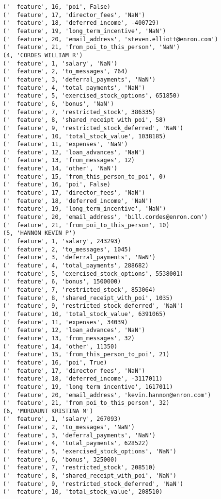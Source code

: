 \begin{verbatim}
('  feature', 16, 'poi', False)
('  feature', 17, 'director_fees', 'NaN')
('  feature', 18, 'deferred_income', -400729)
('  feature', 19, 'long_term_incentive', 'NaN')
('  feature', 20, 'email_address', 'steven.elliott@enron.com')
('  feature', 21, 'from_poi_to_this_person', 'NaN')
(4, 'CORDES WILLIAM R')
('  feature', 1, 'salary', 'NaN')
('  feature', 2, 'to_messages', 764)
('  feature', 3, 'deferral_payments', 'NaN')
('  feature', 4, 'total_payments', 'NaN')
('  feature', 5, 'exercised_stock_options', 651850)
('  feature', 6, 'bonus', 'NaN')
('  feature', 7, 'restricted_stock', 386335)
('  feature', 8, 'shared_receipt_with_poi', 58)
('  feature', 9, 'restricted_stock_deferred', 'NaN')
('  feature', 10, 'total_stock_value', 1038185)
('  feature', 11, 'expenses', 'NaN')
('  feature', 12, 'loan_advances', 'NaN')
('  feature', 13, 'from_messages', 12)
('  feature', 14, 'other', 'NaN')
('  feature', 15, 'from_this_person_to_poi', 0)
('  feature', 16, 'poi', False)
('  feature', 17, 'director_fees', 'NaN')
('  feature', 18, 'deferred_income', 'NaN')
('  feature', 19, 'long_term_incentive', 'NaN')
('  feature', 20, 'email_address', 'bill.cordes@enron.com')
('  feature', 21, 'from_poi_to_this_person', 10)
(5, 'HANNON KEVIN P')
('  feature', 1, 'salary', 243293)
('  feature', 2, 'to_messages', 1045)
('  feature', 3, 'deferral_payments', 'NaN')
('  feature', 4, 'total_payments', 288682)
('  feature', 5, 'exercised_stock_options', 5538001)
('  feature', 6, 'bonus', 1500000)
('  feature', 7, 'restricted_stock', 853064)
('  feature', 8, 'shared_receipt_with_poi', 1035)
('  feature', 9, 'restricted_stock_deferred', 'NaN')
('  feature', 10, 'total_stock_value', 6391065)
('  feature', 11, 'expenses', 34039)
('  feature', 12, 'loan_advances', 'NaN')
('  feature', 13, 'from_messages', 32)
('  feature', 14, 'other', 11350)
('  feature', 15, 'from_this_person_to_poi', 21)
('  feature', 16, 'poi', True)
('  feature', 17, 'director_fees', 'NaN')
('  feature', 18, 'deferred_income', -3117011)
('  feature', 19, 'long_term_incentive', 1617011)
('  feature', 20, 'email_address', 'kevin.hannon@enron.com')
('  feature', 21, 'from_poi_to_this_person', 32)
(6, 'MORDAUNT KRISTINA M')
('  feature', 1, 'salary', 267093)
('  feature', 2, 'to_messages', 'NaN')
('  feature', 3, 'deferral_payments', 'NaN')
('  feature', 4, 'total_payments', 628522)
('  feature', 5, 'exercised_stock_options', 'NaN')
('  feature', 6, 'bonus', 325000)
('  feature', 7, 'restricted_stock', 208510)
('  feature', 8, 'shared_receipt_with_poi', 'NaN')
('  feature', 9, 'restricted_stock_deferred', 'NaN')
('  feature', 10, 'total_stock_value', 208510)

\end{verbatim}

